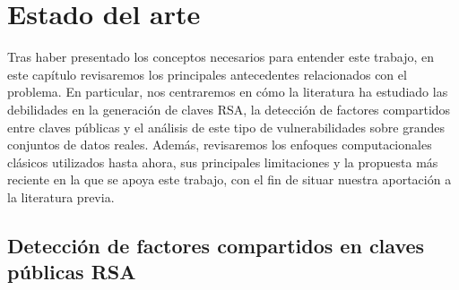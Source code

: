 \chapter{Estado del arte}

Tras haber presentado los conceptos necesarios para entender este trabajo, en este capítulo revisaremos los principales antecedentes relacionados con el problema.
En particular, nos centraremos en cómo la literatura ha estudiado las debilidades en la generación de claves RSA, la detección de factores compartidos entre claves públicas y el análisis de este tipo de vulnerabilidades sobre grandes conjuntos de datos reales. Además, revisaremos los enfoques computacionales clásicos utilizados hasta ahora, sus principales limitaciones y la propuesta más reciente en la que se apoya este trabajo, con el fin de situar nuestra aportación a la literatura previa.

\section{Detección de factores compartidos en claves públicas RSA}


